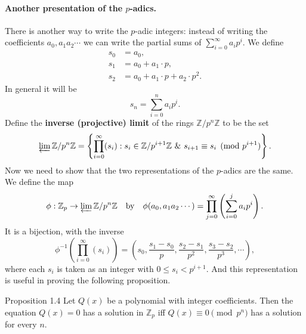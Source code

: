 \documentclass[11pt]{article}
\begin{document}
\paragraph{Another presentation of the $p$-adics.} There is another way to write the $p$-adic integers: instead of writing the coefficients $a_0, a_1 a_2 \cdots$ we can write the partial sums of $\sum_{i=0}^\infty a_i p^i$. We define
\[
\begin{aligned}
s_0 &= a_0, \\
s_1 &= a_0 + a_1\cdot p, \\
s_2 &= a_0 + a_1\cdot p + a_2\cdot p^2 .
\end{aligned}
\]
In general it will be
\[
s_n = \sum_{i=0}^{n} a_i p^i .
\]
Define the \textbf{inverse (projective) limit} of the rings $\mathbb{Z}/p^n\mathbb{Z}$ to be the set
\[
\varprojlim \mathbb{Z}/p^n\mathbb{Z} = \left\{ \prod_{i=0}^\infty (s_i) : s_i \in \mathbb{Z}/p^{i+1}\mathbb{Z} \ \&\ s_{i+1} \equiv s_i \pmod{p^{i+1}} \right\}.
\]
Now we need to show that the two representations of the $p$-adics are the same. We define the map
\[
\phi : \mathbb{Z}_p \rightarrow \varprojlim \mathbb{Z}/p^n\mathbb{Z} \quad\text{by}\quad \phi(a_0, a_1 a_2 \cdots) = \prod_{j=0}^\infty \left( \sum_{i=0}^j a_i p^i \right).
\]
It is a bijection, with the inverse
\[
\phi^{-1}\left( \prod_{i=0}^\infty (s_i) \right) = \left( s_0, \frac{s_1 - s_0}{p}, \frac{s_2 - s_1}{p^2}, \frac{s_3 - s_2}{p^3}, \cdots \right),
\]
where each $s_i$ is taken as an integer with $0 \leq s_i < p^{i+1}$. And this representation is useful in proving the following proposition.

\begin{thmbox}{Proposition 1.4}
Let $Q(x)$ be a polynomial with integer coefficients. Then the equation $Q(x) = 0$ has a solution in $\mathbb{Z}_p$ iff $Q(x) \equiv 0 \pmod{p^n}$ has a solution for every $n$.
\end{thmbox}
\end{document}
